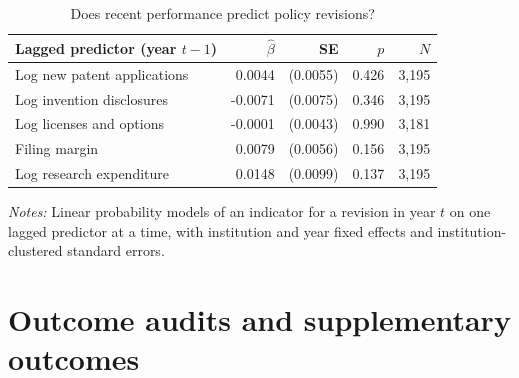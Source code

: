 \begin{table}[htbp]\centering
\caption{Does recent performance predict policy revisions?}\label{tab:predictors}
\begin{threeparttable}\footnotesize
\begin{tabular}{lrrrr}\toprule
Lagged predictor (year $t-1$) & $\hat\beta$ & SE & $p$ & $N$ \\\midrule
Log new patent applications & 0.0044 & (0.0055) & 0.426 & 3,195 \\
Log invention disclosures & -0.0071 & (0.0075) & 0.346 & 3,195 \\
Log licenses and options & -0.0001 & (0.0043) & 0.990 & 3,181 \\
Filing margin & 0.0079 & (0.0056) & 0.156 & 3,195 \\
Log research expenditure & 0.0148 & (0.0099) & 0.137 & 3,195 \\
\bottomrule
\end{tabular}
\begin{tablenotes}[flushleft]\footnotesize
\item \textit{Notes:} Linear probability models of an indicator for a revision in year $t$ on one lagged predictor at a time, with institution and year fixed effects and institution-clustered standard errors.
\end{tablenotes}
\end{threeparttable}
\end{table}

\section{Outcome audits and supplementary outcomes}\label{app:startups}


